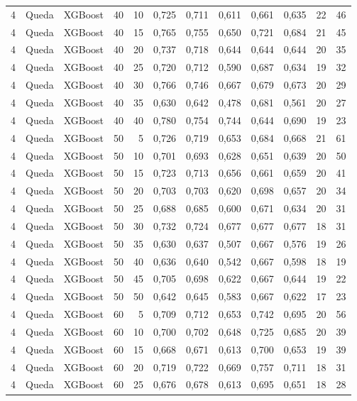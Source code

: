 \begin{longtable}{@{}rllrrrrrrrrr@{}}
4 & Queda & XGBoost & 40 & 10 & 0,725 & 0,711 & 0,611 & 0,661 & 0,635 & 22 & 46 \\
4 & Queda & XGBoost & 40 & 15 & 0,765 & 0,755 & 0,650 & 0,721 & 0,684 & 21 & 45 \\
4 & Queda & XGBoost & 40 & 20 & 0,737 & 0,718 & 0,644 & 0,644 & 0,644 & 20 & 35 \\
4 & Queda & XGBoost & 40 & 25 & 0,720 & 0,712 & 0,590 & 0,687 & 0,634 & 19 & 32 \\
4 & Queda & XGBoost & 40 & 30 & 0,766 & 0,746 & 0,667 & 0,679 & 0,673 & 20 & 29 \\
4 & Queda & XGBoost & 40 & 35 & 0,630 & 0,642 & 0,478 & 0,681 & 0,561 & 20 & 27 \\
4 & Queda & XGBoost & 40 & 40 & 0,780 & 0,754 & 0,744 & 0,644 & 0,690 & 19 & 23 \\
4 & Queda & XGBoost & 50 & 5 & 0,726 & 0,719 & 0,653 & 0,684 & 0,668 & 21 & 61 \\
4 & Queda & XGBoost & 50 & 10 & 0,701 & 0,693 & 0,628 & 0,651 & 0,639 & 20 & 50 \\
4 & Queda & XGBoost & 50 & 15 & 0,723 & 0,713 & 0,656 & 0,661 & 0,659 & 20 & 41 \\
4 & Queda & XGBoost & 50 & 20 & 0,703 & 0,703 & 0,620 & 0,698 & 0,657 & 20 & 34 \\
4 & Queda & XGBoost & 50 & 25 & 0,688 & 0,685 & 0,600 & 0,671 & 0,634 & 20 & 31 \\
4 & Queda & XGBoost & 50 & 30 & 0,732 & 0,724 & 0,677 & 0,677 & 0,677 & 18 & 31 \\
4 & Queda & XGBoost & 50 & 35 & 0,630 & 0,637 & 0,507 & 0,667 & 0,576 & 19 & 26 \\
4 & Queda & XGBoost & 50 & 40 & 0,636 & 0,640 & 0,542 & 0,667 & 0,598 & 18 & 19 \\
4 & Queda & XGBoost & 50 & 45 & 0,705 & 0,698 & 0,622 & 0,667 & 0,644 & 19 & 22 \\
4 & Queda & XGBoost & 50 & 50 & 0,642 & 0,645 & 0,583 & 0,667 & 0,622 & 17 & 23 \\
4 & Queda & XGBoost & 60 & 5 & 0,709 & 0,712 & 0,653 & 0,742 & 0,695 & 20 & 56 \\
4 & Queda & XGBoost & 60 & 10 & 0,700 & 0,702 & 0,648 & 0,725 & 0,685 & 20 & 39 \\
4 & Queda & XGBoost & 60 & 15 & 0,668 & 0,671 & 0,613 & 0,700 & 0,653 & 19 & 39 \\
4 & Queda & XGBoost & 60 & 20 & 0,719 & 0,722 & 0,669 & 0,757 & 0,711 & 18 & 31 \\
4 & Queda & XGBoost & 60 & 25 & 0,676 & 0,678 & 0,613 & 0,695 & 0,651 & 18 & 28 \\

\end{longtable}
